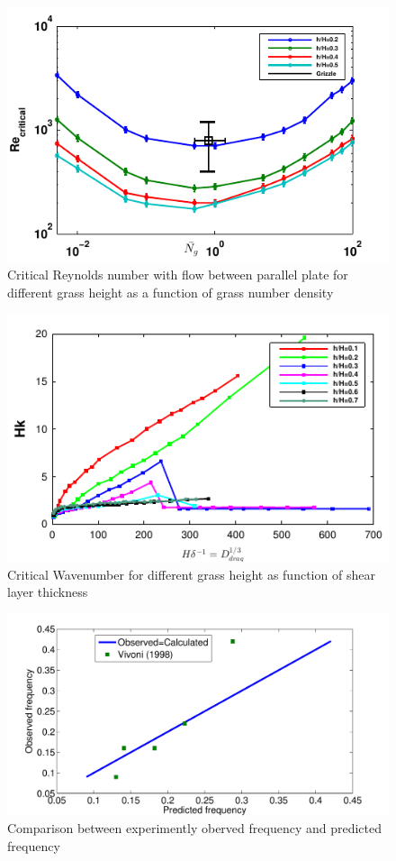 \documentclass[aps,twocolumn,floatfix,prl,10pt]{revtex4-1}
\begin{document}
\begin{figure}[htb!]
\includegraphics[scale=0.8]{Critical_Re_vs_Ng_Grizzle}
\caption{Critical Reynolds number with flow between parallel plate for different grass height as a function of grass number density}
\end{figure}
\begin{figure}[htb!]
\includegraphics[]{K_vs_shear_width}
\caption{Critical Wavenumber for different grass height as function of shear layer thickness}
\end{figure}
\begin{figure}[htb!]
\includegraphics[scale=0.34]{Observed_vs_calculated}
\caption{Comparison between experimently oberved frequency and predicted frequency}
\end{figure}
\end{document}
